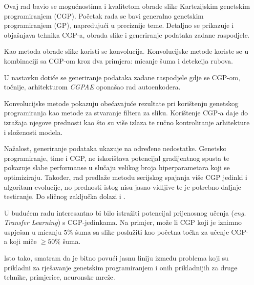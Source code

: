 Ovaj rad bavio se mogućnostima i kvalitetom obrade slike Kartezijskim genetskim programiranjem (CGP).
Početak rada se bavi generalno genetskim programiranjem (GP), napredujući u preciznije teme.
Detaljno se prikazuje i objašnjava tehnika CGP-a, obrada slike i generiranje podataka zadane raspodjele.

Kao metoda obrade slike koristi se konvolucija.
Konvolucijske metode koriste se u kombinaciji sa CGP-om kroz dva primjera: micanje šuma i detekcija rubova.

U nastavku dotiće se generiranje podataka zadane raspodjele gdje se CGP-om, točnije, arhitekturom \emph{CGPAE} oponašao rad autoenkodera.

Konvolucijske metode pokazuju obećavajuće rezultate pri korištenju genetskog programiranja kao metode za stvaranje filtera za sliku.
Korištenje CGP-a daje do izražaja njegove prednosti kao što su više izlaza te ručno kontroliranje arhitekture i složenosti modela.

Nažalost, generiranje podataka ukazuje na određene nedostatke.
Genetsko programiranje, time i CGP, ne iskorištava potencijal gradijentnog spusta te pokazuje slabe performanse u slučaju velikog broja hiperparametara koji se optimiziraju.
Također, rad predlaže metodu serijskog spajanja više CGP jedinki i algoritam evolucije, no prednosti istog nisu jasno vidljive te je potrebno daljnje testiranje.
Do sličnog zaključka dolazi i \cite{conv_gen_programming}.

U budućem radu interesantno bi bilo istražiti potencijal prijenosnog učenja (\emph{eng. Transfer Learning}) s CGP-jedinkama.
Na primjer, može li CGP koji je iznimno uspješan u micanju $5\%$ šuma sa slike poslužiti kao početna točka za učenje CGP-a koji miče $\geq 50\%$ šuma.

Isto tako, smatram da je bitno povući jasnu liniju između problema koji su prikladni za rješavanje genetskim programiranjem i onih prikladnijih za druge tehnike, primjerice, neuronske mreže.
